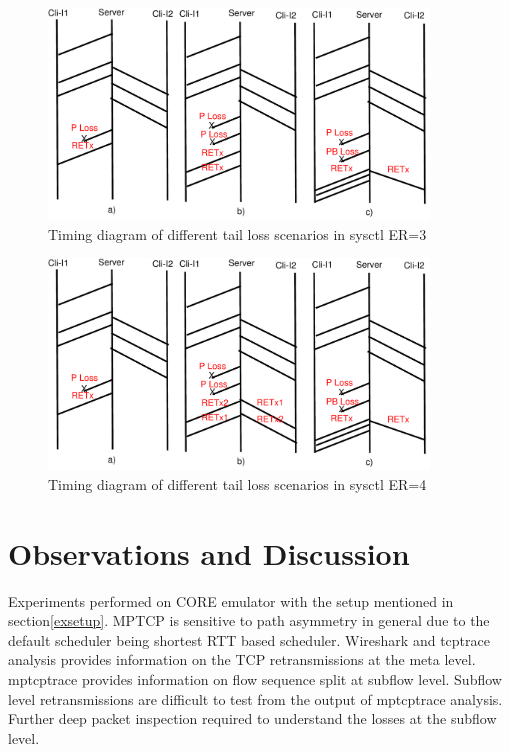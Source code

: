 \documentclass[12pt,draftcls,onecolumn]{IEEEtran}
\begin{document}
\begin{figure}[!ht]
\begin{center}
\includegraphics[angle=0, width=0.9\textwidth, natwidth=610, natheight=400]{images/timingER3.pdf}
\end{center}
\caption{Timing diagram of different tail loss scenarios in sysctl ER=3}\label{timingER3}
\end{figure}

\begin{figure}[!ht]
\begin{center}
\includegraphics[angle=0, width=0.9\textwidth, natwidth=610, natheight=400]{images/timingER4.pdf}
\end{center}
\caption{Timing diagram of different tail loss scenarios in sysctl ER=4}\label{timingER4}
\end{figure}






\section{Observations and Discussion}\label{disc}

Experiments performed on CORE emulator with the setup mentioned in section\ref{exsetup}.
MPTCP is sensitive to path asymmetry in general due to the default scheduler being shortest RTT based scheduler. Wireshark and tcptrace
analysis provides information on the TCP retransmissions at the meta level. mptcptrace provides information on flow sequence split at 
subflow level. Subflow level retransmissions are difficult to test from the output of mptcptrace analysis. Further deep packet inspection
required to understand the losses at the subflow level. 
\end{document}

